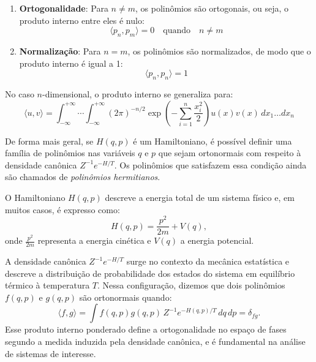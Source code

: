 \documentclass[12pt]{article}
\begin{document}
\begin{enumerate}
    \item \textbf{Ortogonalidade}: Para $n \neq m$, os polinômios são ortogonais, ou seja, o produto interno entre eles é nulo:
    \begin{equation*}
        \langle p_n, p_m \rangle = 0 \quad \text{quando} \quad n \neq m
    \end{equation*}
    
    \item \textbf{Normalização}: Para $n = m$, os polinômios são normalizados, de modo que o produto interno é igual a 1:
    \begin{equation*}
        \langle p_n, p_n \rangle = 1
    \end{equation*}
\end{enumerate}

No caso $n$-dimensional, o produto interno se generaliza para:
\begin{equation*}
    \langle u, v \rangle = \int_{-\infty}^{+\infty} \cdots \int_{-\infty}^{+\infty} (2 \pi)^{-n/2} \exp \left(-\sum_{i=1}^n \frac{x_i^2}{2} \right) u(x) v(x) \, dx_1 \ldots dx_n
\end{equation*}

De forma mais geral, se $H(q, p)$ é um Hamiltoniano, é possível definir uma família de polinômios nas variáveis $q$ e $p$ que sejam ortonormais com respeito à densidade canônica $Z^{-1} e^{-H/T}$. Os polinômios que satisfazem essa condição ainda são chamados de \textit{polinômios hermitianos}.

O Hamiltoniano $H(q, p)$ descreve a energia total de um sistema físico e, em muitos casos, é expresso como:
\begin{equation*}
    H(q, p) = \frac{p^2}{2m} + V(q),
\end{equation*}
onde $\frac{p^2}{2m}$ representa a energia cinética e $V(q)$ a energia potencial.

A densidade canônica $Z^{-1} e^{-H/T}$ surge no contexto da mecânica estatística e descreve a distribuição de probabilidade dos estados do sistema em equilíbrio térmico à temperatura $T$. Nessa configuração, dizemos que dois polinômios $f(q, p)$ e $g(q, p)$ são ortonormais quando:
\begin{equation*}
    \langle f, g \rangle = \int f(q, p) g(q, p) \, Z^{-1} e^{-H(q, p)/T} \, dq \, dp = \delta_{fg}.
\end{equation*}
Esse produto interno ponderado define a ortogonalidade no espaço de fases segundo a medida induzida pela densidade canônica, e é fundamental na análise de sistemas de interesse.
\end{document}
